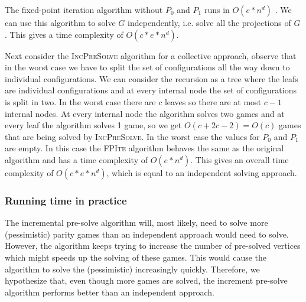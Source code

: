 The fixed-point iteration algorithm without $P_0$ and $P_1$ runs in $O(e*n^d)$ \cite{FPITE}. We can use this algorithm to solve $G$ independently, i.e. solve all the projections of $G$. This gives a time complexity of $O(c*e*n^d)$.

Next consider the \textsc{IncPreSolve} algorithm for a collective approach, observe that in the worst case we have to split the set of configurations all the way down to individual configurations. We can consider the recursion as a tree where the leafs are individual configurations and at every internal node the set of configurations is split in two. In the worst case there are $c$ leaves so there are at most $c-1$ internal nodes. At every internal node the algorithm solves two games and at every leaf the algorithm solves 1 game, so we get $O(c + 2c - 2) = O(c)$ games that are being solved by \textsc{IncPreSolve}. In the worst case the values for $P_0$ and $P_1$ are empty. In this case the \textsc{FPIte} algorithm behaves the same as the original algorithm and has a time complexity of $O(e*n^d)$. This gives an overall time complexity of $O(c*e*n^d)$, which is equal to an independent solving approach.

\subsubsection{Running time in practice}
The incremental pre-solve algorithm will, most likely, need to solve more (pessimistic) parity games than an independent approach would need to solve. However, the algorithm keeps trying to increase the number of pre-solved vertices which might speeds up the solving of these games. This would cause the algorithm to solve the (pessimistic) increasingly quickly. Therefore, we hypothesize that, even though more games are solved, the increment pre-solve algorithm performs better than an independent approach.